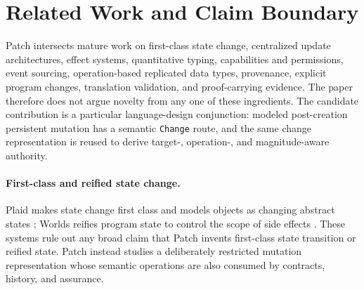 
\section{Related Work and Claim Boundary}
\label{sec:related-work}

Patch intersects mature work on first-class state change, centralized update architectures, effect systems, quantitative typing, capabilities and permissions, event sourcing, operation-based replicated data types, provenance, explicit program changes, translation validation, and proof-carrying evidence. The paper therefore does not argue novelty from any one of these ingredients. The candidate contribution is a particular language-design conjunction: modeled post-creation persistent mutation has a semantic \texttt{Change} route, and the same change representation is reused to derive target-, operation-, and magnitude-aware authority.

\paragraph{First-class and reified state change.}
Plaid makes state change first class and models objects as changing abstract states \cite{sunshine2011plaid}; Worlds reifies program state to control the scope of side effects \cite{warth2011worlds}. These systems rule out any broad claim that Patch invents first-class state transition or reified state. Patch instead studies a deliberately restricted mutation representation whose semantic operations are also consumed by contracts, history, and assurance.

